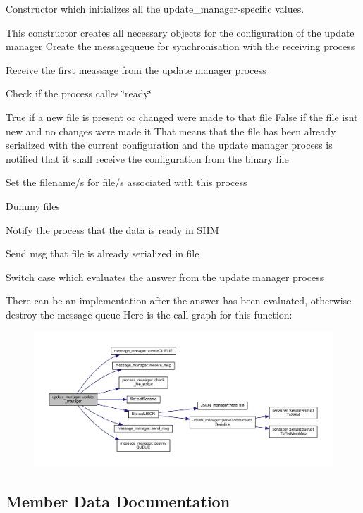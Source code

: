 Constructor which initializes all the update\+\_\+manager-\/specific values. 

This constructor creates all necessary objects for the configuration of the update manager Create the messagequeue for synchronisation with the receiving process

Receive the first meassage from the update manager process

Check if the process calles \char`\"{}ready\char`\"{}

True if a new file is present or changed were made to that file False if the file isnt new and no changes were made it That means that the file has been already serialized with the current configuration and the update manager process is notified that it shall receive the configuration from the binary file

Set the filename/s for file/s associated with this process

Dummy files

Notify the process that the data is ready in S\+HM

Send msg that file is already serialized in file

Switch case which evaluates the answer from the update manager process

There can be an implementation after the answer has been evaluated, otherwise destroy the message queue Here is the call graph for this function\+:
\nopagebreak
\begin{figure}[H]
\begin{center}
\leavevmode
\includegraphics[width=350pt]{classupdate__manager_a8e4ba9f4d46f5100825dd8853bdd06f4_cgraph}
\end{center}
\end{figure}


\subsection{Member Data Documentation}
\mbox{\label{classupdate__manager_a4c743063be347d20da665ace8fc1a4a2}} 
